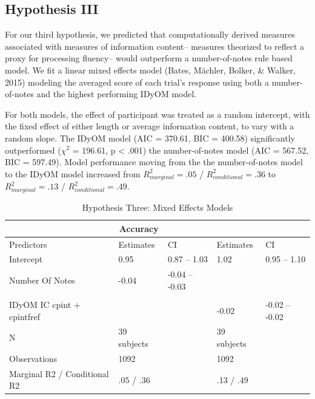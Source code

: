 \documentclass[english,man,floatsintext]{apa6}
\begin{document}
\hypertarget{hypothesis-iii}{%
\subsection{Hypothesis III}\label{hypothesis-iii}}

For our third hypothesis, we predicted that computationally derived measures associated with measures of information content-- measures theorized to reflect a proxy for processing fluency-- would outperform a number-of-notes rule based model.
We fit a linear mixed effects model (Bates, Mächler, Bolker, \& Walker, 2015) modeling the averaged score of each trial's response using both a number-of-notes and the highest performing IDyOM model.

For both models, the effect of participant was treated as a random intercept, with the fixed effect of either length or average information content, to vary with a random slope. The IDyOM model (AIC = 370.61, BIC = 400.58) significantly outperformed (\(\chi^2\) = 196.61, p \textless{} .001) the number-of-notes model (AIC = 567.52, BIC = 597.49).
Model performance moving from the the number-of-notes model to the IDyOM model increased from \(R^2_{marginal} = .05\) / \(R^2_{conditional} = .36\) to \(R^2_{marginal} = .13\) / \(R^2_{conditional} = .49\).

\begin{table}[tbp]

\begin{center}
\begin{threeparttable}

\caption{\label{tab:unnamed-chunk-6}Hypothesis Three: Mixed Effects Models}

\begin{tabular}{lllll}
\toprule
 & \multicolumn{1}{c}{Accuracy} & \multicolumn{1}{c}{} & \multicolumn{1}{c}{} & \multicolumn{1}{c}{}\\
\midrule
Predictors & Estimates & CI & Estimates & CI\\
Intercept & 0.95 & 0.87 – 1.03 & 1.02 & 0.95 – 1.10\\
Number Of Notes & -0.04 & -0.04 – -0.03 &  & \\
 &  &  &  & \\
IDyOM IC cpint + cpintfref &  &  & -0.02 & -0.02 – -0.02\\
N & 39 subjects &  & 39 subjects & \\
Observations & 1092 &  & 1092 & \\
Marginal R2 / Conditional R2 & .05 / .36 &  & .13 / .49 & \\
\bottomrule
\end{tabular}

\end{threeparttable}
\end{center}

\end{table}
\end{document}
